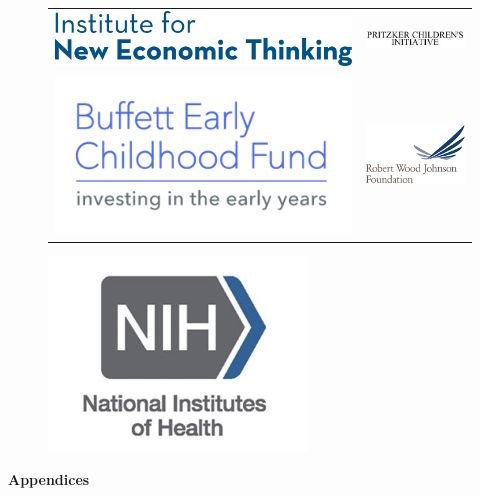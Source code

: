 \documentclass[static]{JJH-Beamer}
\begin{document}
\begin{frame}
 \addtocounter{framenumber}{-1}
\begin{figure}[H]
\begin{center}
\begin{tabular}{cc}
\includegraphics[width=.4\columnwidth]{include/INET_logo} & \includegraphics[width=.45\columnwidth]{include/Pritzker-Logo}\\
\includegraphics[width=.35\columnwidth]{include/Buffett-Logo} & \includegraphics[width=.35\columnwidth]{include/hss-t-footer-RWJF-logo}\\
\end{tabular}
\includegraphics[width=.25\columnwidth]{include/NIH-Logo}
\end{center}
\end{figure}

\end{frame}

\clearpage


\begin{frame}
 \addtocounter{framenumber}{-1}
\begin{block}{}
\begin{center}
\textbf{Appendices}
\end{center}
\end{block}

\end{frame}
\end{document}
